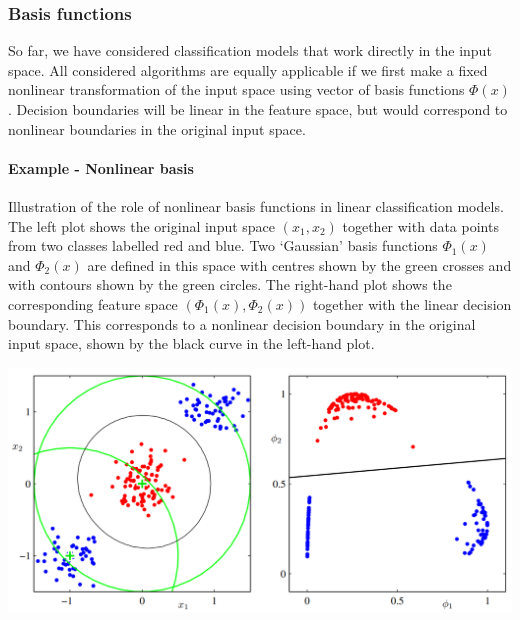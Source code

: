 \documentclass[../main.tex]{subfiles}
\begin{document}
\newpage
\subsubsection{Basis functions}
So far, we have considered classification models that work directly in the input space. All considered algorithms are equally applicable if we first make a fixed nonlinear transformation of the input space using vector of basis functions $\Phi(x)$. Decision boundaries will be linear in the feature space, but would correspond to nonlinear boundaries in the original input space.
\paragraph{Example - Nonlinear basis}
Illustration of the role of nonlinear basis functions in linear classification models. The left plot shows the original input space $(x_1, x_2)$ together with data points from two classes labelled red and blue. Two
‘Gaussian’ basis functions $\Phi_1(x)$ and $\Phi_2(x)$ are defined in this space with centres shown by the green crosses
and with contours shown by the green circles. The right-hand plot shows the corresponding feature space $(\Phi_1(x), \Phi_2(x))$ together with the linear decision boundary. This corresponds to a nonlinear decision boundary in the original input space, shown by the black curve in the left-hand plot.
\begin{center}
    \includegraphics[scale=0.50]{images/LS_Gaussian_Basis.PNG}
\end{center}
\end{document}
